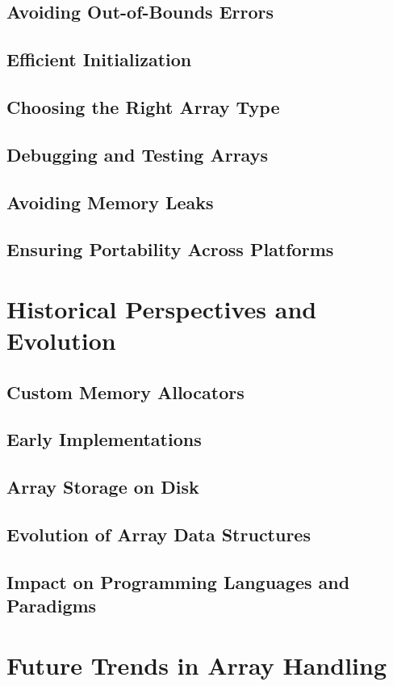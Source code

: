 \documentclass[12pt, oneside]{book}
\begin{document}
\section{Avoiding Out-of-Bounds Errors}
\section{Efficient Initialization}
\section{Choosing the Right Array Type}
\section{Debugging and Testing Arrays}
\section{Avoiding Memory Leaks}
\section{Ensuring Portability Across Platforms}

\chapter{Historical Perspectives and Evolution}
\section{Custom Memory Allocators}\section{Early Implementations}
\section{Array Storage on Disk}\section{Evolution of Array Data Structures}
\section{Impact on Programming Languages and Paradigms}

\chapter{Future Trends in Array Handling}
\end{document}
